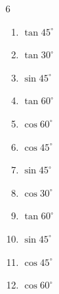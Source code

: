 \begin{multicols}{6}
\begin{enumerate}

  \item $\displaystyle \tan{45^\circ}$

        \phantom{$\displaystyle =1$}

  \item $\displaystyle \tan{30^\circ}$


  \item $\displaystyle \sin{45^\circ}$


\columnbreak %

\resetques

  \item $\displaystyle \tan{60^\circ}$


  \item $\displaystyle \cos{60^\circ}$


  \item $\displaystyle \cos{45^\circ}$


  \item $\displaystyle \sin{45^\circ}$


  \item $\displaystyle \cos{30^\circ}$


  \item $\displaystyle \tan{60^\circ}$


  \item $\displaystyle \sin{45^\circ}$


  \item $\displaystyle \cos{45^\circ}$


  \item $\displaystyle \cos{60^\circ}$


\end{enumerate}
\end{multicols}
